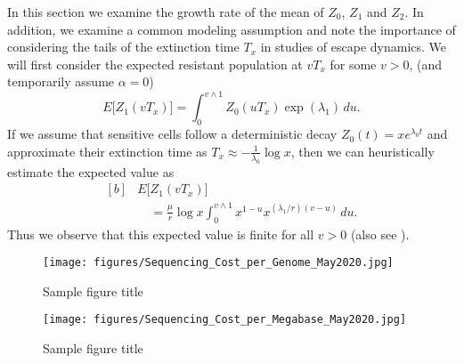\documentclass{bmcart}
\begin{document}
		In this section we examine the growth rate of the mean of $Z_0$, $Z_1$ and $Z_2$. In
		addition, we examine a common modeling assumption and note the
		importance of considering the tails of the extinction time $T_x$ in
		studies of escape dynamics.
		We will first consider the expected resistant population at $vT_x$ for
		some $v>0$, (and temporarily assume $\alpha=0$)
		\[
		E \bigl[Z_1(vT_x) \bigr]=
		\int_0^{v\wedge
			1}Z_0(uT_x)
		\exp (\lambda_1)\,du .
		\]
		If we assume that sensitive cells follow a deterministic decay
		$Z_0(t)=xe^{\lambda_0 t}$ and approximate their extinction time as
		$T_x\approx-\frac{1}{\lambda_0}\log x$, then we can heuristically
		estimate the expected value as
		\begin{equation}\label{eqexpmuts}
			\begin{aligned}[b]
				&      E\bigl[Z_1(vT_x)\bigr]\\
				&\quad      = \frac{\mu}{r}\log x
				\int_0^{v\wedge1}x^{1-u}x^{({\lambda_1}/{r})(v-u)}\,du .
			\end{aligned}
		\end{equation}
		Thus we observe that this expected value is finite for all $v>0$ (also see \cite{koon,xjon,marg,schn,koha,issnic}).
		
		
		
		\begin{figure}[h!]
			\texttt{[image: figures/Sequencing\_Cost\_per\_Genome\_May2020.jpg]}
			\caption{Sample figure title}
			\label{fig:cost_genome}
		\end{figure}
		
		\begin{figure}[h!]
			\texttt{[image: figures/Sequencing\_Cost\_per\_Megabase\_May2020.jpg]}
			\caption{Sample figure title}
			\label{fig:cost_megabase}
		\end{figure}
		
\end{document}
